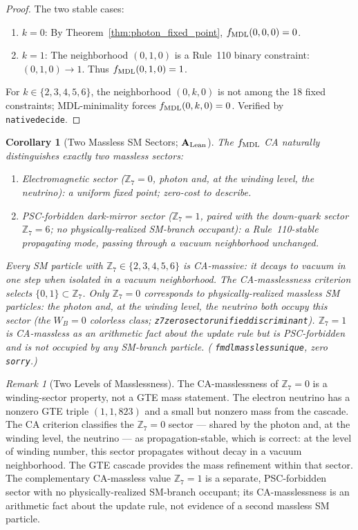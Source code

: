 \documentclass[11pt]{article}
\newtheorem{corollary}[theorem]{Corollary}
\theoremstyle{remark}
\newtheorem{remark}[theorem]{Remark}
\newcommand{\lean}[1]{%
  \penalty-100
  \begingroup\def\_{\textunderscore\allowbreak}\texttt{#1}\endgroup}
\newcommand{\CatAL}{\ensuremath{\textbf{A}_{\rm Lean}}}
\begin{document}
\begin{proof}
The two stable cases:
\begin{enumerate}[nosep,leftmargin=1.5em]
\item $k = 0$: By Theorem~\ref{thm:photon_fixed_point}, $f_{\rm MDL}(0,0,0) = 0$.
\item $k = 1$: The neighborhood $(0,1,0)$ is a Rule~110 binary constraint:
  $(0,1,0) \to 1$.  Thus $f_{\rm MDL}(0,1,0) = 1$.
\end{enumerate}
For $k \in \{2,3,4,5,6\}$, the neighborhood $(0,k,0)$ is not among the 18
fixed constraints; MDL-minimality forces $f_{\rm MDL}(0,k,0) = 0$.
Verified by \lean{native\_decide}.
\end{proof}

\begin{corollary}[Two Massless SM Sectors; $\CatAL$]
\label{cor:massless_sectors}
The $f_{\rm MDL}$ CA naturally distinguishes exactly two massless sectors:
\begin{enumerate}[nosep,leftmargin=1.5em]
\item \emph{Electromagnetic sector} ($\mathbb{Z}_7 = 0$, photon and, at the
  winding level, the neutrino): a uniform fixed point; zero-cost to describe.
\item \emph{PSC-forbidden dark-mirror sector} ($\mathbb{Z}_7 = 1$, paired with
  the down-quark sector $\mathbb{Z}_7=6$; no physically-realized SM-branch
  occupant): a Rule~110-stable propagating mode, passing through a vacuum
  neighborhood unchanged.
\end{enumerate}
Every SM particle with $\mathbb{Z}_7 \in \{2,3,4,5,6\}$ is CA-massive: it
decays to vacuum in one step when isolated in a vacuum neighborhood.
The CA-masslessness criterion selects $\{0,1\} \subset \mathbb{Z}_7$.  Only
$\mathbb{Z}_7 = 0$ corresponds to physically-realized massless SM particles:
the photon and, at the winding level, the neutrino both occupy this sector
(the $W_B{=}0$ colorless class; \lean{z7\_zero\_sector\_unified\_discriminant}).
$\mathbb{Z}_7 = 1$ is CA-massless as an arithmetic fact about the update rule
but is PSC-forbidden and is not occupied by any SM-branch particle.
(\lean{fmdl\_massless\_unique}, zero \texttt{sorry}.)
\end{corollary}

\begin{remark}[Two Levels of Masslessness]
The CA-masslessness of $\mathbb{Z}_7 = 0$ is a winding-sector property, not
a GTE mass statement.  The electron neutrino has a nonzero GTE triple
$(1,1,823)$ and a small but nonzero mass from the cascade.  The CA criterion
classifies the $\mathbb{Z}_7 = 0$ sector --- shared by the photon and, at the
winding level, the neutrino --- as propagation-stable, which is correct: at
the level of winding number, this sector propagates without decay in a
vacuum neighborhood.  The GTE cascade provides the mass refinement within
that sector.  The complementary CA-massless value $\mathbb{Z}_7 = 1$ is a
separate, PSC-forbidden sector with no physically-realized SM-branch
occupant; its CA-masslessness is an arithmetic fact about the update rule,
not evidence of a second massless SM particle.
\end{remark}
\end{document}
